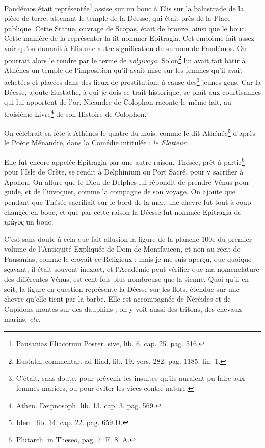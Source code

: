 \documentclass[a4paper, 18pt, oneside]{article}
\begin{document}
Pandémos était représentée\footnote{Pausanias Eliacorum Poster. sive, lib. 6. cap. 25. pag. 516.} assise sur un bouc à Elis sur la balustrade de la pièce de terre, attenant le temple de la Déesse, qui était près de la Place publique. Cette Statue, ouvrage de Scopas, était de bronze, ainsi que le bouc. Cette manière de la représenter la fit nommer Epitragia. Cet emblème fait assez voir qu'on donnait à Elis une autre signification du surnom de Pandémos. On pourrait alors le rendre par le terme de \emph{volgivaga}. Solon\footnote{Eustath. commentar. ad Iliad, lib. 19. vers. 282, pag. 1185. lin. 1.} lui avait fait bâtir à Athènes un temple de l'imposition qu'il avait mise sur les femmes qu'il avait achetées et placées dans des lieux de prostitution, à cause des\footnote{C'était, sans doute, pour prévenir les insultes qu'ils auraient pu faire aux femmes mariées, ou pour éviter les vices contre nature.} jeunes gens. Car la Déesse, ajoute Eustathe, à qui je dois ce trait historique, se plaît aux courtisannes qui lui apportent de l'or. Nicandre de Colophon raconte le même fait, au troisième Livre\footnote{Athen. Deipnosoph. lib. 13. cap. 3. pag. 569.} de son Histoire de Colophon.

On célébrait sa fête à Athènes le quatre du mois, comme le dit Athénée\footnote{Idem. lib. 14. cap. 22. pag. 659 D.} d'après le Poète Ménandre, dans la Comédie intitulée : \emph{le Flatteur}.

Elle fut encore appelée Epitragia par une autre raison. Thésée, prêt à partir\footnote{Plutarch. in Theseo, pag. 7. F. 8. A.} pour l'Isle de Crète, se rendit à Delphinium ou Port Sacré, pour y sacrifier à Apollon. On allure que le Dieu de Delphes lui répondit de prendre Vénus pour guide, et de l'invoquer, comme la compagne de son voyage. On ajoute que pendant que Thésée sacrifiait sur le bord de la mer, une chevre fut tout-à-coup changée en bouc, et que par cette raison la Déesse fut nommée Epitragia de τράγος un bouc.

C'est sans doute à cela que fait allusion la figure de la planche 100e du premier volume de l'Antiquité Expliquée de Dom de Montfaucon, et non au récit de Pausanias, comme le croyait ce Religieux ; mais je me suis aperçu, que quoique sçavant, il était souvent inexact, et l'Académie peut vérifier que ma nomenclature des différentes Vénus, est cent fois plus nombreuse que la sienne. Quoi qu'il en soit, la figure en question représente la Déesse sur les flots, étendue sur une chevre qu'elle tient par la barbe. Elle est accompagnée de Néréides et de Cupidons montés sur des dauphins ; on y voit aussi des tritons, des chevaux marins, \emph{etc.}
\end{document}
